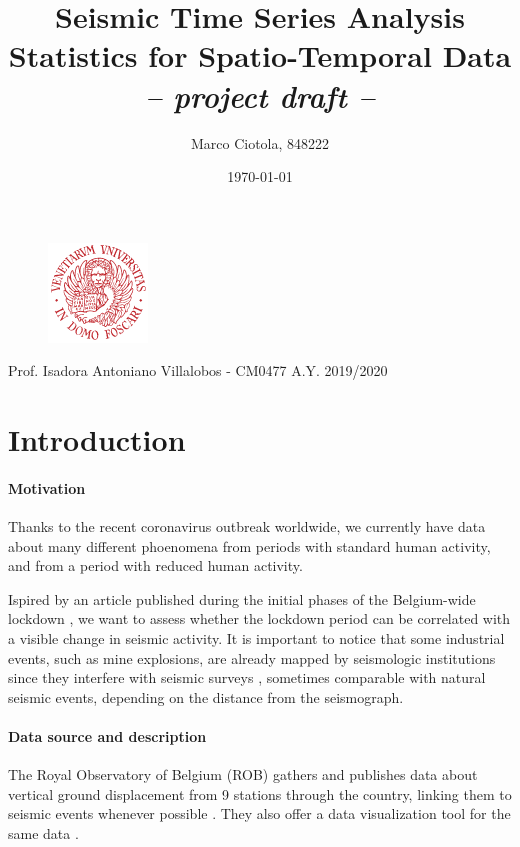 \documentclass[12pt]{article}
\title{Seismic Time Series Analysis\\Statistics for Spatio-Temporal Data\\\textit{-- project draft --}}
\author{Marco Ciotola, 848222}
\date{\today}
\begin{document}
\maketitle
\begin{figure}[t!]
	\begin{center}
		\includegraphics[width=100px]{ca_foscari_logo.png}
	\end{center}
\end{figure}
\vfill Prof. Isadora Antoniano Villalobos - CM0477
\hfill A.Y. 2019/2020
\newpage
\tableofcontents \clearpage
{}



\section{Introduction}

\paragraph{Motivation}
Thanks to the recent coronavirus outbreak worldwide, we currently have data about many different phoenomena from periods with standard human activity, and from a period with reduced human activity.

Ispired by an article published during the initial phases of the Belgium-wide lockdown \cite{NatureCoronavirusSeismic}, we want to assess whether the lockdown period can be correlated with a visible change in seismic activity.
It is important to notice that some industrial events, such as mine explosions, are already mapped by seismologic institutions since they interfere with seismic surveys \cite{OtherSeismicEvents}, sometimes comparable with natural seismic events, depending on the distance from the seismograph.


\paragraph{Data source and description}
The Royal Observatory of Belgium (ROB) gathers and publishes \cite{RoyalDataPolicy,Data20200402} data about vertical ground displacement from 9 stations through the country, linking them to seismic events whenever possible \cite{DataEvents20200402}. They also offer a data visualization tool for the same data \cite{DataVisualization20200402}.
\end{document}

